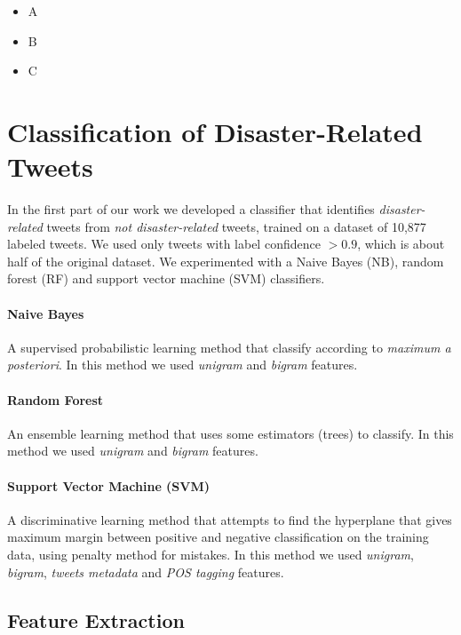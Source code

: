 \documentclass[letterpaper,twocolumn,10pt]{article}
\begin{document}
\begin{itemize}[noitemsep,nolistsep]
	\item A
	\item B
	\item C
\end{itemize}



\section{Classification of Disaster-Related Tweets}

In the first part of our work we developed a classifier that identifies \textit{disaster-related} tweets from \textit{not disaster-related} tweets,  trained on a dataset of 10,877 labeled tweets. We used only tweets with label confidence $>0.9$, which is about half of the original dataset. We experimented with a Naive Bayes (NB), random forest (RF) and support vector machine (SVM) classifiers.

\paragraph{Naive Bayes}
A supervised probabilistic learning method that classify according to \textit{maximum a posteriori}. In this method we used \textit{unigram} and \textit{bigram} features.

\paragraph{Random Forest}
An ensemble learning method that uses some estimators (trees) to classify. In this method we used \textit{unigram} and \textit{bigram} features.

\paragraph{Support Vector Machine (SVM)}
A discriminative learning method that attempts to find the hyperplane that gives maximum margin between positive and negative classification on the training data, using penalty method for mistakes. In this method we used \textit{unigram}, \textit{bigram}, \textit{tweets metadata} and \textit{POS tagging} features.

\subsection{Feature Extraction}
\end{document}
